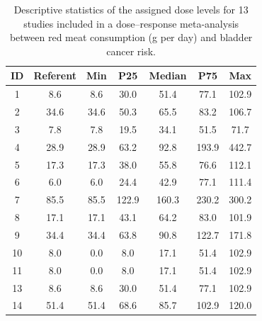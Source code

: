 \documentclass[11pt,a4paper,twoside,openany]{book}\usepackage{knitr}
\begin{document}
{{\begin{knitrout}
\begin{table}[!h]
\caption{\label{tab:chr_redtab}Descriptive statistics of the assigned dose levels for 13 studies 
      included in a dose--response meta-analysis between red meat consumption (g per day) and bladder
      cancer risk.}
\centering
\begin{tabular}[t]{ccccccc}
\toprule
ID & Referent & Min & P25 & Median & P75 & Max\\
\midrule
1 & 8.6 & 8.6 & 30.0 & 51.4 & 77.1 & 102.9\\
2 & 34.6 & 34.6 & 50.3 & 65.5 & 83.2 & 106.7\\
3 & 7.8 & 7.8 & 19.5 & 34.1 & 51.5 & 71.7\\
4 & 28.9 & 28.9 & 63.2 & 92.8 & 193.9 & 442.7\\
5 & 17.3 & 17.3 & 38.0 & 55.8 & 76.6 & 112.1\\
6 & 6.0 & 6.0 & 24.4 & 42.9 & 77.1 & 111.4\\
7 & 85.5 & 85.5 & 122.9 & 160.3 & 230.2 & 300.2\\
8 & 17.1 & 17.1 & 43.1 & 64.2 & 83.0 & 101.9\\
9 & 34.4 & 34.4 & 63.8 & 90.8 & 122.7 & 171.8\\
10 & 8.0 & 0.0 & 8.0 & 17.1 & 51.4 & 102.9\\
11 & 8.0 & 0.0 & 8.0 & 17.1 & 51.4 & 102.9\\
13 & 8.6 & 8.6 & 30.0 & 51.4 & 77.1 & 102.9\\
14 & 51.4 & 51.4 & 68.6 & 85.7 & 102.9 & 120.0\\
\bottomrule
\end{tabular}
\end{table}


\end{knitrout}


}}
\end{document}
